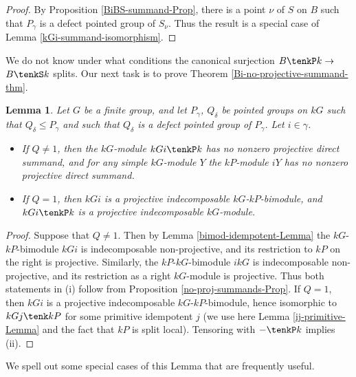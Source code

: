 \documentclass{amsart}
\theoremstyle{plain}\newtheorem{Theorem}{Theorem}[section]
\theoremstyle{plain}\newtheorem{Conjecture}[Theorem]{Conjecture}
\theoremstyle{plain}\newtheorem{Corollary}[Theorem]{Corollary}
\theoremstyle{plain}\newtheorem{Lemma}[Theorem]{Lemma}
\theoremstyle{plain}\newtheorem{Proposition}[Theorem]{Proposition}
\theoremstyle{definition}\newtheorem{Definition}[Theorem]{Definition}
\theoremstyle{definition}\newtheorem{Example}[Theorem]{Example}
\theoremstyle{definition}\newtheorem{Examples}[Theorem]{Examples}
\theoremstyle{definition}\newtheorem{Exercise}[Theorem]{Exercise}
\theoremstyle{definition}\newtheorem{Notation}[Theorem]{Notation}
\theoremstyle{definition}\newtheorem{Remark}[Theorem]{Remark}
\theoremstyle{definition}\newtheorem{Remarks}[Theorem]{Remarks}
\theoremstyle{plain}\newtheorem{Statement}[Theorem]{}
\begin{document}
\begin{proof}
By Proposition \ref{BiBS-summand-Prop}, there is a point $\nu$ of $S$ on
$B$ such that $P_\gamma$ is a defect pointed group of $S_\nu$.
Thus the result  is a special case of Lemma \ref{kGi-summand-isomorphism}.
\end{proof}
We do not know under what conditions the canonical surjection $B\tenkP k\to$ 
$B\tenkS k$ splits.  
Our next task is  to  prove   Theorem  \ref{Bi-no-projective-summand-thm}.

\begin{Lemma} \label{no-proj-summands-Lemma}
Let $G$ be a finite group, and let $P_\gamma$, $Q_\delta$  be pointed groups
on $kG$ such that $Q_\delta\leq P_\gamma$ and such that $Q_\delta$ is
a defect pointed group of $P_\gamma$. Let $i\in \gamma$.
\begin{itemize}

\item[{\rm (i)}]
If $Q\neq 1$, then the $kG$-module $kGi \tenkP k$ has no nonzero projective 
direct summand, and for any  simple $kG$-module $Y$ the $kP$-module $iY$ has
no nonzero projective direct summand.
\item[{\rm (ii)}]
If $Q=1$, then  $kGi$ is a projective indecomposable $kG$-$kP$-bimodule, and
$kGi\tenkP k$ is a projective indecomposable $kG$-module.
\end{itemize}
\end{Lemma}

\begin{proof}
Suppose that $Q\neq 1$. Then  by Lemma \ref{bimod-idempotent-Lemma} the $kG$-$kP$-bimodule $kGi$ is 
indecomposable non-projective, and its restriction to $kP$ on the right
is projective. Similarly,  the $kP$-$kG$-bimodule $ikG$ is indecomposable 
non-projective, and its restriction as a right $kG$-module is  projective.   Thus 
both statements in  (i) follow from  Proposition \ref{no-proj-summands-Prop}.
If $Q=1$, then $kGi$ is a projective indecomposable  $kG$-$kP$-bimodule,
hence isomorphic to $kGj\tenk kP$ for some primitive idempotent $j$
(we use here Lemma \ref{ij-primitive-Lemma} and the fact that $kP$ is split local).
Tensoring with $-\tenkP k$ implies (ii). 
\end{proof}

We spell out some special cases of this Lemma that are frequently useful.
\end{document}
